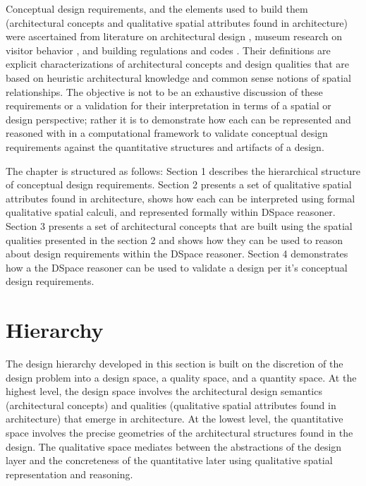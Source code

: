 \documentclass[12pt]{ucthesis}
\begin{document}
Conceptual design requirements, and the elements used to build them (architectural concepts and qualitative spatial attributes found in architecture) were ascertained from literature on architectural design \cite{tbd}, museum research on visitor behavior \cite{tbd}, and building regulations and codes \cite{tbd}. Their definitions are explicit characterizations of architectural concepts and design qualities that are based on heuristic architectural knowledge and common sense notions of spatial relationships. The objective is not to be an exhaustive discussion of these requirements or a validation for their interpretation in terms of a spatial or design perspective; rather it is to demonstrate how each can be represented and reasoned with in a computational framework to validate conceptual design requirements against the quantitative structures and artifacts of a design. 

The chapter is structured as follows: Section 1 describes the hierarchical structure of conceptual design requirements. Section 2 presents a set of qualitative spatial attributes found in architecture, shows how each can be interpreted using formal qualitative spatial calculi, and represented formally within DSpace reasoner. Section 3 presents a set of architectural concepts that are built using the spatial qualities presented in the section 2 and shows how they can be used to reason about design requirements within the DSpace reasoner. Section 4 demonstrates how a the DSpace reasoner can be used to validate a design per it's conceptual design requirements.

\section{Hierarchy}
The design hierarchy developed in this section is built on the discretion of the design problem into a design space, a quality space, and a quantity space. At the highest level, the design space involves the architectural design semantics (architectural concepts) and qualities (qualitative spatial attributes found in architecture) that emerge in architecture. At the lowest level, the quantitative space involves the precise geometries of the architectural structures found in the design. The qualitative space mediates between the abstractions of the design layer and the concreteness of the quantitative later using qualitative spatial representation and reasoning.
 
\end{document}
